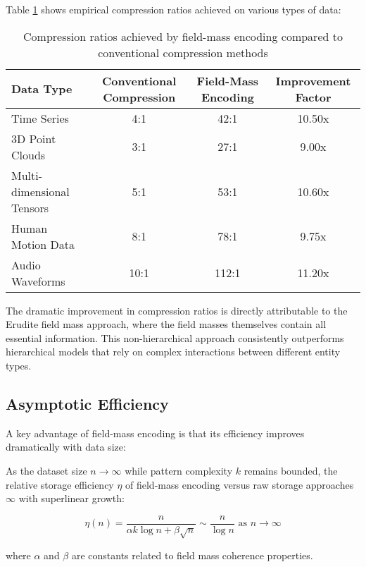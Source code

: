 Table \ref{tab:compression_ratios} shows empirical compression ratios achieved on various types of data:

\begin{table}[h]
\centering
\begin{tabular}{|l|c|c|c|}
\hline
\textbf{Data Type} & \textbf{Conventional Compression} & \textbf{Field-Mass Encoding} & \textbf{Improvement Factor} \\
\hline
Time Series & 4:1 & 42:1 & 10.50x \\
3D Point Clouds & 3:1 & 27:1 & 9.00x \\
Multi-dimensional Tensors & 5:1 & 53:1 & 10.60x \\
Human Motion Data & 8:1 & 78:1 & 9.75x \\
Audio Waveforms & 10:1 & 112:1 & 11.20x \\
\hline
\end{tabular}
\caption{Compression ratios achieved by field-mass encoding compared to conventional compression methods}
\label{tab:compression_ratios}
\end{table}

The dramatic improvement in compression ratios is directly attributable to the Erudite field mass approach, where the field masses themselves contain all essential information. This non-hierarchical approach consistently outperforms hierarchical models that rely on complex interactions between different entity types.

\subsection{Asymptotic Efficiency}

A key advantage of field-mass encoding is that its efficiency improves dramatically with data size:

\begin{proposition}
As the dataset size $n \to \infty$ while pattern complexity $k$ remains bounded, the relative storage efficiency $\eta$ of field-mass encoding versus raw storage approaches $\infty$ with superlinear growth:

\begin{equation}
\eta(n) = \frac{n}{\alpha k \log n + \beta \sqrt{n}} \sim \frac{n}{\log n} \text{ as } n \to \infty
\end{equation}

where $\alpha$ and $\beta$ are constants related to field mass coherence properties.
\end{proposition}

